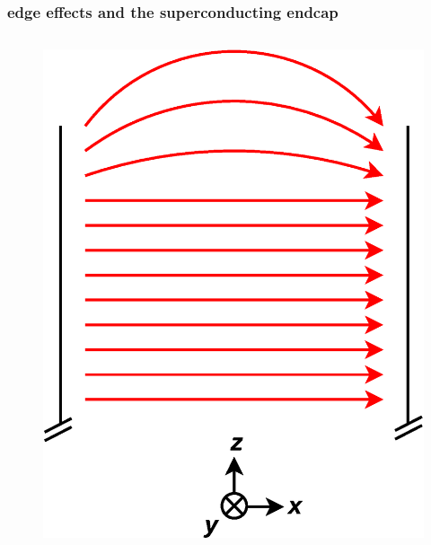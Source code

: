 \documentclass[handout]{beamer}
\begin{document}
\begin{frame}
\frametitle{edge effects and the superconducting endcap}

    \begin{columns}[b]
    
    \begin{column}{0.5\textwidth}
    \begin{figure}
    \includegraphics[width=\textwidth]
    {figures/field_noendcap.eps}
    \end{figure}
    \vspace{0pt}
    \end{column}

    \pause


\end{columns}
\end{frame}
\end{document}
